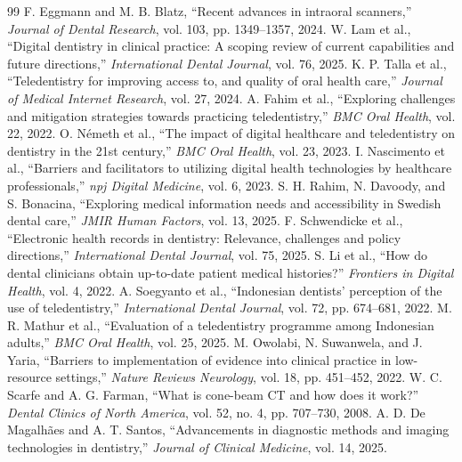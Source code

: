 \documentclass[journal]{IEEEtran}
\begin{document}
\begin{thebibliography}{99}
 F. Eggmann and M. B. Blatz, ``Recent advances in intraoral scanners,'' \emph{Journal of Dental Research}, vol. 103, pp. 1349--1357, 2024.
 W. Lam et al., ``Digital dentistry in clinical practice: A scoping review of current capabilities and future directions,'' \emph{International Dental Journal}, vol. 76, 2025.
 K. P. Talla et al., ``Teledentistry for improving access to, and quality of oral health care,'' \emph{Journal of Medical Internet Research}, vol. 27, 2024.
 A. Fahim et al., ``Exploring challenges and mitigation strategies towards practicing teledentistry,'' \emph{BMC Oral Health}, vol. 22, 2022.
 O. N\'emeth et al., ``The impact of digital healthcare and teledentistry on dentistry in the 21st century,'' \emph{BMC Oral Health}, vol. 23, 2023.
 I. Nascimento et al., ``Barriers and facilitators to utilizing digital health technologies by healthcare professionals,'' \emph{npj Digital Medicine}, vol. 6, 2023.
 S. H. Rahim, N. Davoody, and S. Bonacina, ``Exploring medical information needs and accessibility in Swedish dental care,'' \emph{JMIR Human Factors}, vol. 13, 2025.
 F. Schwendicke et al., ``Electronic health records in dentistry: Relevance, challenges and policy directions,'' \emph{International Dental Journal}, vol. 75, 2025.
 S. Li et al., ``How do dental clinicians obtain up-to-date patient medical histories?'' \emph{Frontiers in Digital Health}, vol. 4, 2022.
 A. Soegyanto et al., ``Indonesian dentists' perception of the use of teledentistry,'' \emph{International Dental Journal}, vol. 72, pp. 674--681, 2022.
 M. R. Mathur et al., ``Evaluation of a teledentistry programme among Indonesian adults,'' \emph{BMC Oral Health}, vol. 25, 2025.
 M. Owolabi, N. Suwanwela, and J. Yaria, ``Barriers to implementation of evidence into clinical practice in low-resource settings,'' \emph{Nature Reviews Neurology}, vol. 18, pp. 451--452, 2022.
 W. C. Scarfe and A. G. Farman, ``What is cone-beam CT and how does it work?'' \emph{Dental Clinics of North America}, vol. 52, no. 4, pp. 707--730, 2008.
 A. D. De Magalh\~{a}es and A. T. Santos, ``Advancements in diagnostic methods and imaging technologies in dentistry,'' \emph{Journal of Clinical Medicine}, vol. 14, 2025.

\end{thebibliography}
\end{document}
